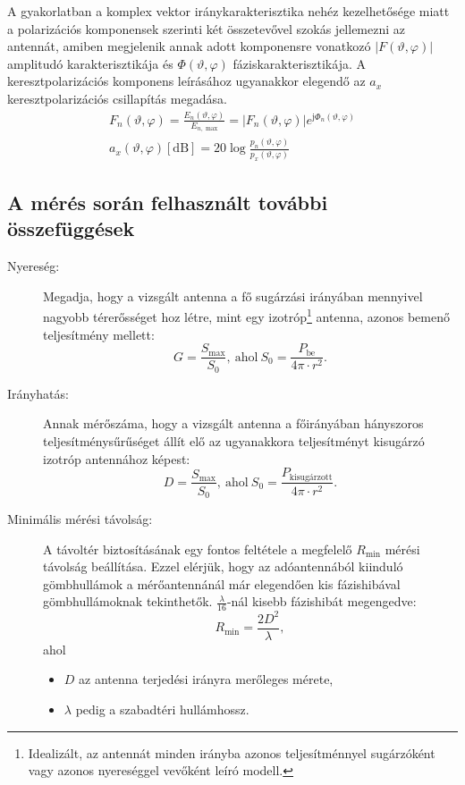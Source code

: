 \documentclass{article}
\newcommand{\partp}{\left(\vartheta,\varphi\right)}
\begin{document}
A gyakorlatban a komplex vektor iránykarakterisztika nehéz kezelhetősége miatt a polarizációs komponensek szerinti két összetevővel szokás jellemezni az antennát, amiben megjelenik annak adott komponensre vonatkozó $\left|F\partp\right|$ amplitudó karakterisztikája és $\Phi\partp$ fáziskarakterisztikája. A keresztpolarizációs komponens leírásához ugyanakkor elegendő az $a_x$ keresztpolarizációs csillapítás  megadása. 
\begin{gather}
    F_n\partp=\frac{E_n\partp}{E_{n,\text{ max}}}=\left|F_n\partp\right|e^{\mathrm j\Phi_n\partp}\\
    a_x\partp\left[\mathrm{dB}\right]=20\log\frac{p_n\partp}{p_x\partp}
\end{gather}
\subsection{A mérés során felhasznált további összefüggések}
\begin{description}

    \item[Nyereség:] Megadja, hogy a vizsgált antenna a fő sugárzási irányában mennyivel nagyobb térerősséget hoz létre, mint egy izotróp\footnote{Idealizált, az antennát minden irányba azonos teljesítménnyel sugárzóként vagy azonos nyereséggel vevőként leíró modell.} antenna, azonos bemenő teljesítmény mellett: \[G=\frac{S_\text{max}}{S_0},\ \text{ahol}\ S_0=\frac{P_\text{be}}{4\pi\cdot r^2}.\]

    \item[Irányhatás:] Annak mérőszáma, hogy a vizsgált antenna a főirányában hányszoros teljesítménysűrűséget állít elő az ugyanakkora teljesítményt kisugárzó izotróp antennához képest: \[D=\frac{S_\text{max}}{S_0},\ \text{ahol}\ S_0=\frac{P_\text{kisugárzott}}{4\pi\cdot r^2}.\]

    \item[Minimális mérési távolság:] A távoltér biztosításának egy fontos feltétele a megfelelő $R_\text{min}$ mérési távolság beállítása. Ezzel elérjük, hogy az adóantennából kiinduló gömbhullámok a mérőantennánál már elegendően kis fázishibával gömbhullámoknak tekinthetők. $\frac\lambda{16}$-nál kisebb fázishibát megengedve: \[R_\text{min}=\frac{2D^2}\lambda,\]
    ahol \begin{itemize}
        \item $D$ az antenna terjedési irányra merőleges mérete,
        \item $\lambda$ pedig a szabadtéri hullámhossz.
    \end{itemize}
\end{description}
\end{document}
